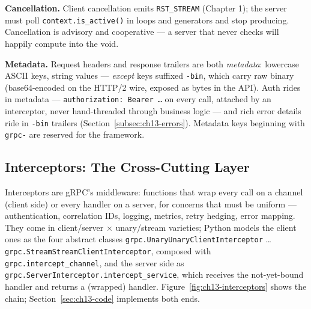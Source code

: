 \textbf{Cancellation.} Client cancellation emits \texttt{RST\_STREAM} (Chapter
1); the server must poll \texttt{context.is\_active()} in loops and generators
and stop producing. Cancellation is advisory and cooperative --- a server that
never checks will happily compute into the void.

\textbf{Metadata.} Request headers and response trailers are both
\emph{metadata}: lowercase ASCII keys, string values --- \emph{except} keys
suffixed \texttt{-bin}, which carry raw binary (base64-encoded on the HTTP/2
wire, exposed as bytes in the API). Auth rides in metadata ---
\texttt{authorization: Bearer \ldots} on every call, attached by an interceptor,
never hand-threaded through business logic --- and rich error details ride in
\texttt{-bin} trailers (Section~\ref{subsec:ch13-errors}). Metadata keys
beginning with \texttt{grpc-} are reserved for the framework.

\subsection{Interceptors: The Cross-Cutting Layer}
\label{subsec:ch13-interceptors}

Interceptors are gRPC's middleware: functions that wrap every call on a channel
(client side) or every handler on a server, for concerns that must be uniform
--- authentication, correlation IDs, logging, metrics, retry hedging, error
mapping. They come in client/server $\times$ unary/stream varieties; Python
models the client ones as the four abstract classes
\texttt{grpc.UnaryUnaryClientInterceptor} \ldots{}
\texttt{grpc.StreamStreamClientInterceptor}, composed with
\texttt{grpc.intercept\_channel}, and the server side as
\texttt{grpc.ServerInterceptor.intercept\_service}, which receives the
not-yet-bound handler and returns a (wrapped) handler.
Figure~\ref{fig:ch13-interceptors} shows the chain; Section~\ref{sec:ch13-code}
implements both ends.


